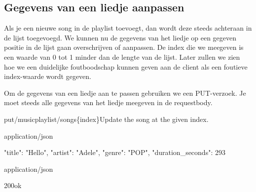 \subsection{Gegevens van een liedje aanpassen}

Als je een nieuwe song in de playlist toevoegt, dan wordt deze steeds achteraan in de lijst toegevoegd. We kunnen nu de gegevens van het liedje op een gegeven positie in de lijst gaan overschrijven of aanpassen.  De index die we meegeven is een waarde van 0 tot 1 minder dan de lengte van de lijst.  Later zullen we zien hoe we een duidelijke foutboodschap kunnen geven aan de client als een foutieve index-waarde wordt gegeven.

Om de gegevens van een liedje aan te passen gebruiken we een PUT-verzoek. 
Je moet steeds alle gegevens van het liedje meegeven in de requestbody. 

\begin{apiRoute}{put}{/musicplaylist/songs\{index\}}{Update the song at the given index.}
\begin{routeParameter}
\end{routeParameter}
\begin{routeRequest}{application/json}
\begin{routeRequestBody}
{
		"title": "Hello",
		"artist": "Adele",
		"genre": "POP",
		"duration_seconds": 293
}
\end{routeRequestBody}
\end{routeRequest}
\begin{routeResponse}{application/json}
\begin{routeResponseItem}{200}{ok}
\end{routeResponseItem}
\end{routeResponse}
\end{apiRoute}


